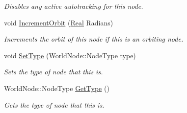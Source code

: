\begin{DoxyCompactItemize}
\begin{DoxyCompactList}\small\item\em Disables any active autotracking for this node. \item\end{DoxyCompactList}\item 
void \hyperlink{classphys_1_1WorldNode_a0849395a47c9cd3182a6a3717b95bcbc}{IncrementOrbit} (\hyperlink{namespacephys_af7eb897198d265b8e868f45240230d5f}{Real} Radians)
\begin{DoxyCompactList}\small\item\em Increments the orbit of this node if this is an orbiting node. \item\end{DoxyCompactList}\item 
void \hyperlink{classphys_1_1WorldNode_abc4cf216177c0a3f4397c83fe3b58e75}{SetType} (WorldNode::NodeType type)
\begin{DoxyCompactList}\small\item\em Sets the type of node that this is. \item\end{DoxyCompactList}\item 
WorldNode::NodeType \hyperlink{classphys_1_1WorldNode_a9688a418ab6871f89845b69f02ab7f9c}{GetType} ()
\begin{DoxyCompactList}\small\item\em Gets the type of node that this is. \item\end{DoxyCompactList}\end{DoxyCompactItemize}

